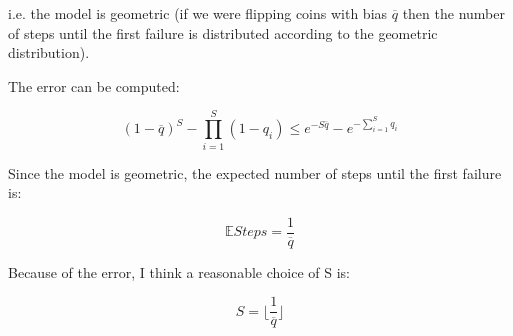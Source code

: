\documentclass[11pt]{article}
\theoremstyle{remark}
\numberwithin{equation}{section}
\newcommand{\E}{\mathbb{E}}
\begin{document}
i.e. the model is geometric (if we were flipping coins with bias \(\overline{q}\) then the number of steps until the first failure is distributed according to the geometric distribution). 

The error can be computed: 

\begin{equation}
(1-\overline{q})^S - \prod_{i=1}^S (1-q_i) \leq e^{-S\overline{q}} - e^{-\sum_{i=1}^S q_i} 
\end{equation}

Since the model is geometric, the expected number of steps until the first failure is: 

\begin{equation}
\E{Steps} = \frac{1}{\overline{q}}
\end{equation}

Because of the error, I think a reasonable choice of S is: 

\begin{equation}
S = \lfloor \frac{1}{\overline{q}} \rfloor
\end{equation}
\end{document}

